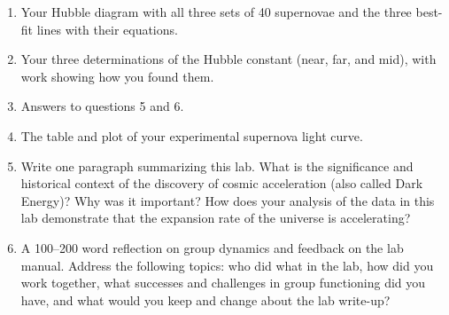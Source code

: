 \begin{enumerate}
	\item Your Hubble diagram with all three sets of 40 supernovae and the three best-fit lines with their equations.
	
	\item Your three determinations of the Hubble constant (near, far, and mid), with work showing how you found them.
	
	\item Answers to questions 5 and 6.
	
	\item The table and plot of your experimental supernova light curve.
	
	\item Write
	one paragraph summarizing this lab. What is the significance and
	historical context of the discovery of cosmic acceleration (also called
	Dark Energy)? Why was it important? How does your analysis of the
	data in this lab demonstrate that the expansion rate of the universe is
	accelerating?
	
	\item A 100--200 word reflection on group dynamics and feedback on the lab manual. Address the following topics: who did what in the lab, how did you work together, what successes and challenges in group functioning did you have, and what would you keep and change about the lab write-up?
\end{enumerate}